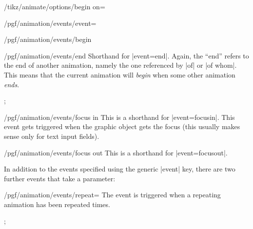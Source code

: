 \begin{key}{/tikz/animate/options/begin on=}
\begin{key}{/pgf/animation/events/event=}
\begin{key}{/pgf/animation/events/begin}
        \end{key}
        \begin{key}{/pgf/animation/events/end}
            Shorthand for |event=end|. Again, the ``end'' refers to the end of
            another animation, namely the one referenced by |of| or |of whom|.
            This means that the current animation will \emph{begin} when some
            other animation \emph{ends}.
\begin{codeexample}[width=2cm,preamble={\usetikzlibrary{animations}}]
\tikz {};
\end{codeexample}
        \end{key}
        \begin{key}{/pgf/animation/events/focus in}
            This is a shorthand for |event=focusin|. This event gets triggered
            when the graphic object gets the focus (this usually makes sense
            only for text input fields).
        \end{key}
        \begin{key}{/pgf/animation/events/focus out}
            This is a shorthand for |event=focusout|.
        \end{key}
    \end{key}

    In addition to the events specified using the generic |event| key, there
    are two further events that take a parameter:
    \begin{key}{/pgf/animation/events/repeat=}
        The event is triggered when a repeating animation has been repeated
         times.
\begin{codeexample}[
    preamble={\usetikzlibrary{animations}},
    animation list={
        0.333/\frac{1}{3},0.666/\frac{2}{3},1,
        1.333/1\frac{1}{3},1.666/1\frac{2}{3},2,
        2.333/2\frac{1}{3},2.666/2\frac{2}{3},3,
        3.333/2\frac{1}{3},3.666/2\frac{2}{3},4%
    },
]
\tikz
  ;
\end{codeexample}
    \end{key}


\end{key}
